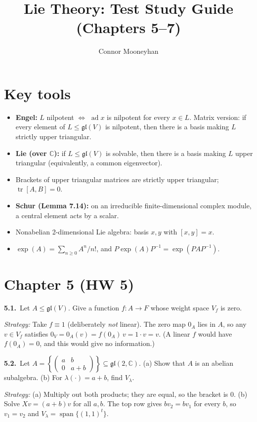 \documentclass[11pt]{article}
\title{Lie Theory: Test Study Guide (Chapters 5--7)}
\author{Connor Mooneyhan}
\date{}
\DeclareMathOperator{\ad}{ad}
\DeclareMathOperator{\tr}{tr}
\DeclareMathOperator{\Span}{span}
\newcommand{\gl}{\mathfrak{gl}}
\newcommand{\prob}[3]{%
	\par\medskip\noindent\textbf{#1.}\ #2\par
	\noindent\hspace*{1.5em}\begin{minipage}[t]{\dimexpr\linewidth-1.5em}
		\textit{Strategy:} #3
	\end{minipage}\par}
\begin{document}
\maketitle

\section*{Key tools}
\begin{itemize}[nosep]
	\item \textbf{Engel:} $L$ nilpotent $\iff$ $\ad x$ is nilpotent for every $x \in L$.
	      Matrix version: if every element of $L \le \gl(V)$ is nilpotent, then there is a basis making $L$ strictly upper triangular.
	\item \textbf{Lie (over $\mathbb{C}$):} if $L \le \gl(V)$ is solvable, then there is a basis making $L$ upper triangular (equivalently, a common eigenvector).
	\item Brackets of upper triangular matrices are strictly upper triangular; $\tr[A,B] = 0$.
	\item \textbf{Schur (Lemma 7.14):} on an irreducible finite-dimensional complex module, a central element acts by a scalar.
	\item Nonabelian 2-dimensional Lie algebra: basis $x,y$ with $[x,y] = x$.
	\item $\exp(A) = \sum_{n \ge 0} A^n/n!$, and $P\exp(A)P^{-1} = \exp(PAP^{-1})$.
\end{itemize}

\section*{Chapter 5 (HW 5)}

\prob{5.1}{Let $A \le \gl(V)$.
	Give a function $f : A \to F$ whose weight space $V_f$ is zero.}
{Take $f \equiv 1$ (deliberately \emph{not} linear).
	The zero map $0_A$ lies in $A$, so any $v \in V_f$ satisfies $0_V = 0_A(v) = f(0_A)\,v = 1 \cdot v = v$.
	(A linear $f$ would have $f(0_A) = 0$, and this would give no information.)}

\prob{5.2}{Let $A = \left\{\begin{pmatrix} a & b \\ 0 & a+b \end{pmatrix}\right\} \subseteq \gl(2,\mathbb{C})$.
	(a) Show that $A$ is an abelian subalgebra.
	(b) For $\lambda(\cdot) = a+b$, find $V_\lambda$.}
{(a) Multiply out both products; they are equal, so the bracket is $0$.
	(b) Solve $Xv = (a+b)v$ for all $a,b$.
	The top row gives $bv_2 = bv_1$ for every $b$, so $v_1 = v_2$ and $V_\lambda = \Span\{(1,1)^t\}$.}
\end{document}
